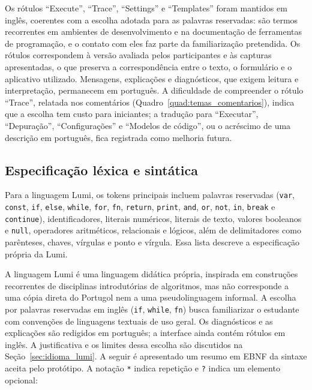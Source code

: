 \documentclass[
    12pt
    ,oneside
    ,a4paper
    ,chapter=TITLE
    ,section=TITLE
    ,sumario=abnt-6027-2012]{abntex2}
\begin{document}
Os rótulos ``Execute'', ``Trace'', ``Settings'' e ``Templates'' foram mantidos em
inglês, coerentes com a escolha adotada para as palavras reservadas: são termos
recorrentes em ambientes de desenvolvimento e na documentação de ferramentas de
programação, e o contato com eles faz parte da familiarização pretendida. Os
rótulos correspondem à versão avaliada pelos participantes e às capturas
apresentadas, o que preserva a correspondência entre o texto, o formulário e o
aplicativo utilizado. Mensagens, explicações e diagnósticos, que exigem leitura e
interpretação, permanecem em português. A dificuldade de compreender o rótulo
``Trace'', relatada nos comentários (Quadro~\ref{quad:temas_comentarios}), indica
que a escolha tem custo para iniciantes; a tradução para ``Executar'',
``Depuração'', ``Configurações'' e ``Modelos de código'', ou o acréscimo de uma
descrição em português, fica registrada como melhoria futura.

\subsection{Especificação léxica e sintática}
\label{sec:especificacao_lumi}

Para a linguagem Lumi, os tokens
principais incluem palavras reservadas (\texttt{var}, \texttt{const}, \texttt{if},
\texttt{else}, \texttt{while}, \texttt{for}, \texttt{fn}, \texttt{return}, \texttt{print},
\texttt{and}, \texttt{or}, \texttt{not}, \texttt{in}, \texttt{break} e \texttt{continue}),
identificadores, literais numéricos, literais de texto, valores booleanos e \texttt{null},
operadores aritméticos, relacionais e lógicos, além de delimitadores como parênteses, chaves,
vírgulas e ponto e vírgula. Essa lista descreve a especificação própria da Lumi.

A linguagem Lumi é uma linguagem didática própria, inspirada em construções recorrentes de
disciplinas introdutórias de algoritmos, mas não corresponde a uma cópia direta do Portugol nem
a uma pseudolinguagem informal. A escolha por palavras reservadas em inglês
(\texttt{if}, \texttt{while}, \texttt{fn}) busca familiarizar o estudante com convenções
de linguagens textuais de uso geral. Os diagnósticos e as explicações são redigidos em
português; a interface ainda contém rótulos em inglês. A justificativa e os limites
dessa escolha são discutidos na Seção~\ref{sec:idioma_lumi}. A seguir é apresentado
um resumo em EBNF da sintaxe aceita pelo protótipo.
A notação \texttt{*} indica repetição e \texttt{?}
indica um elemento opcional:
\end{document}
